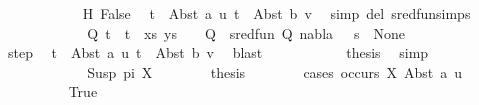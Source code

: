 \begin{isabellebody}
\ \ \ \ \ \ \ \ \ \ \isamarkupfalse%
\ H\ False\ \isamarkupfalse%
\ {\isacartoucheopen}t{}\ {\isacharequal}{\kern0pt}\ Abst\ a\ u{\isacartoucheclose}\ {\isacartoucheopen}t{}\ {\isacharequal}{\kern0pt}\ Abst\ b\ v{\isacartoucheclose}\ \isamarkupfalse%
\ {\isacharparenleft}{\kern0pt}simp\ del{\isacharcolon}{\kern0pt}\ sred{\isacharunderscore}{\kern0pt}fun{\isachardot}{\kern0pt}simps{\isacharparenright}{\kern0pt}\isanewline
\ \ \ \ \ \ \ \ \isamarkupfalse%
\ \isamarkupfalse%
\ {\isachardoublequoteopen}{\isasymexists}{\isasymsigma}\ Q{\isachardot}{\kern0pt}\ {\isacharparenleft}{\kern0pt}{\isacharparenleft}{\kern0pt}t{}\ {\isasymapprox}{\isacharquery}{\kern0pt}\ t{}{\isacharparenright}{\kern0pt}\ {\isacharhash}{\kern0pt}\ xs{\isacharcomma}{\kern0pt}\ ys{\isacharparenright}{\kern0pt}\ {\isasymturnstile}\ {\isasymsigma}\ {\isasymleadsto}\ Q\ {\isasymand}\ sred{\isacharunderscore}{\kern0pt}fun\ {\isacharparenleft}{\kern0pt}Q{\isacharcomma}{\kern0pt}\ nabla{\isacharcomma}{\kern0pt}\ {\isasymsigma}\ {\isasymbullet}\ s{\isacharparenright}{\kern0pt}\ {\isacharequal}{\kern0pt}\ None{\isachardoublequoteclose}\isanewline
\ \ \ \ \ \ \ \ \ \ \isamarkupfalse%
\ step\ \isamarkupfalse%
\ {\isacartoucheopen}t{}\ {\isacharequal}{\kern0pt}\ Abst\ a\ u{\isacartoucheclose}\ {\isacartoucheopen}t{}\ {\isacharequal}{\kern0pt}\ Abst\ b\ v{\isacartoucheclose}\ \isamarkupfalse%
\ blast\isanewline
\ \ \ \ \ \ \ \ \isamarkupfalse%
\ \isamarkupfalse%
\ {\isacharquery}{\kern0pt}thesis\ \isamarkupfalse%
\ simp\isanewline
\ \ \ \ \ \ \isamarkupfalse%
\isanewline
\ \ \ \ \isamarkupfalse%
\isanewline
\ \ \ \ \ \ \isamarkupfalse%
\ {\isacharparenleft}{\kern0pt}Susp\ pi\ X{\isacharparenright}{\kern0pt}\isanewline
\ \ \ \ \ \ \isamarkupfalse%
\ {\isacharquery}{\kern0pt}thesis\isanewline
\ \ \ \ \ \ \isamarkupfalse%
\ {\isacharparenleft}{\kern0pt}cases\ {\isachardoublequoteopen}occurs\ X\ {\isacharparenleft}{\kern0pt}Abst\ a\ u{\isacharparenright}{\kern0pt}{\isachardoublequoteclose}{\isacharparenright}{\kern0pt}\isanewline
\ \ \ \ \ \ \ \ \isamarkupfalse%
\ True\isanewline
\ \ \ \ \ \ \ \ %
\isanewline
\ \ \ \ \ \ \ \ \isamarkupfalse%

\end{isabellebody}
